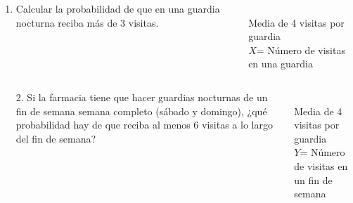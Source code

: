 \documentclass[aspectratio=149,10pt,xcolor=dvipsnames,t]{beamer}
\begin{document}


\begin{frame}
\begin{columns}
\begin{column}[T]{0.6\textwidth}
\begin{enumerate}
\item Calcular la probabilidad de que en una guardia nocturna reciba más de 3 visitas.
\end{enumerate}
\end{column}
\begin{column}[T]{0.4\textwidth}
\\
Media de 4 visitas por guardia\\
$X$= Número de visitas en una guardia

\end{column}
\end{columns}
\end{frame}


\begin{frame}
\begin{columns}
\begin{column}[T]{0.6\textwidth}
\begin{enumerate}
\item[2.] Si la farmacia tiene que hacer guardias nocturnas de un fin de semana semana completo (sábado y domingo), ¿qué
probabilidad hay de que reciba al menos 6 visitas a lo largo del fin de semana?
\end{enumerate}

\end{column}
\begin{column}[T]{0.4\textwidth}
\\
Media de 4 visitas por guardia\\
$Y$= Número de visitas en un fin de semana
\end{column}
\end{columns}
\end{frame}
\end{document}
